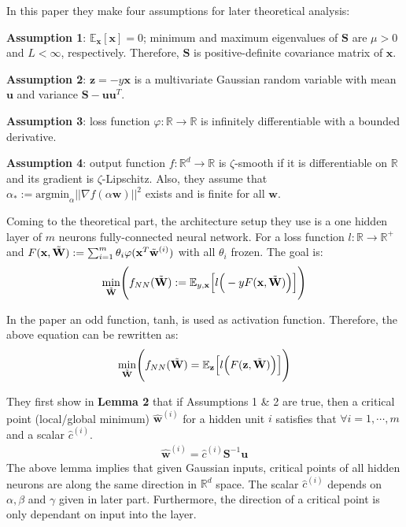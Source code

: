\documentclass{article}
\begin{document}
In this paper they make four assumptions for later theoretical analysis:

\textbf{Assumption 1}: $\mathbb{E}_{\textbf{x}}[\textbf{x}]=0$; minimum and maximum eigenvalues of $\textbf{S}$ are $\mu>0$ and $L<\infty$, respectively. Therefore, $\textbf{S}$ is positive-definite covariance matrix of $\textbf{x}$.

\textbf{Assumption 2}: $\textbf{z}=-y\textbf{x}$ is a multivariate Gaussian random variable with mean $\textbf{u}$ and variance $\textbf{S}-\textbf{uu}^T$.

\textbf{Assumption 3}: loss function $\varphi:\mathbb{R}\rightarrow{}\mathbb{R}$ is infinitely differentiable with a bounded derivative.

\textbf{Assumption 4}: output function $f:\mathbb{R}^d\rightarrow{}\mathbb{R}$ is $\zeta$-smooth if it is differentiable on $\mathbb{R}$ and its gradient is $\zeta$-Lipschitz. Also, they assume that $\alpha_*:=\mathrm{argmin}_{\alpha}||\nabla f(\alpha\textbf{w})||^2$ exists and is finite for all $\textbf{w}$.

Coming to the theoretical part, the architecture setup they use is a one hidden layer of $m$ neurons fully-connected neural network. For a loss function $l:\mathbb{R}\rightarrow{}\mathbb{R}^+$ and $F(\textbf{x},\Tilde{\textbf{W}}):=\sum_{i=1}^m\theta_i\varphi(\textbf{x}^T\Tilde{\textbf{w}}^{(i)})$ with all $\theta_i$ frozen. The goal is:
\begin{align*}
\underset{\Tilde{\textbf{W}}}{\min}\Bigg(f_{NN}(\Tilde{\textbf{W}}):=\mathbb{E}_{y,\textbf{x}}\Big[l\Big(-yF(\textbf{x},\Tilde{\textbf{W}})\Big)\Big]\Bigg)
\end{align*}

In the paper an odd function, tanh, is used as activation function. Therefore, the above equation can be rewritten as:
\begin{align*}
\underset{\Tilde{\textbf{W}}}{\min}\Bigg(f_{NN}(\Tilde{\textbf{W}})=\mathbb{E}_{\textbf{z}}\Big[l\Big(F(\textbf{z},\Tilde{\textbf{W}})\Big)\Big]\Bigg)
\end{align*}

They first show in \textbf{Lemma 2} that if Assumptions 1 \& 2 are true, then a critical point (local/global minimum) $\hat{\textbf{w}}^{(i)}$ for a hidden unit $i$ satisfies that $\forall i=1,\cdots,m$ and a scalar $\hat{c}^{(i)}$.
\begin{align*}
\hat{\textbf{w}}^{(i)}=\hat{c}^{(i)}\textbf{S}^{-1}\textbf{u}
\end{align*}
The above lemma implies that given Gaussian inputs, critical points of all hidden neurons are along the same direction in $\mathbb{R}^d$ space. The scalar $\hat{c}^{(i)}$ depends on $\alpha, \beta$ and $\gamma$ given in later part. Furthermore, the direction of a critical point is only dependant on input into the layer. 
\end{document}
